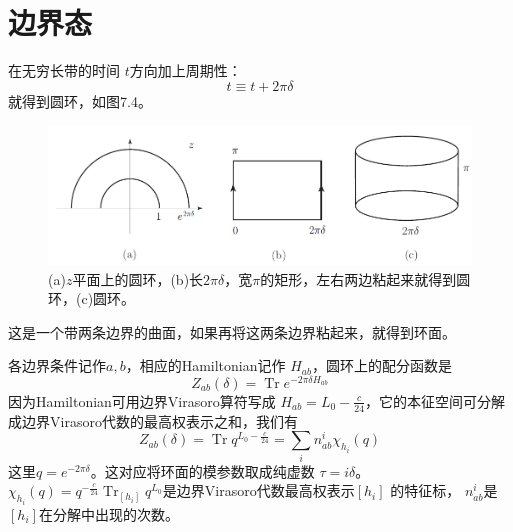 \section{边界态}
在无穷长带的时间 $t $方向加上周期性：
$$
t \equiv t+2 \pi \delta
$$
就得到圆环，如图7.4。
\begin{figure}[h]
	\centering
	\includegraphics[width=0.6\linewidth]{fig/7.4.png}
	\caption{(a)$z$平面上的圆环，(b)长$2\pi \delta$，宽$\pi$的矩形，左右两边粘起来就得到圆环，(c)圆环。}
\end{figure}

这是一个带两条边界的曲面，如果再将这两条边界粘起来，就得到环面。

各边界条件记作$ a,b $，相应的Hamiltonian记作 $H_{ab} $，圆环上的配分函数是
\begin{equation}
	Z_{a b}(\delta)=\operatorname{Tr} e^{-2 \pi \delta H_{a b}} 
\end{equation}
因为Hamiltonian可用边界Virasoro算符写成 $H_{a b}=L_{0}-\frac{c}{24} $，它的本征空间可分解成边界Virasoro代数的最高权表示之和，我们有
\begin{equation}
	Z_{a b}(\delta)=\operatorname{Tr} q^{L_{0}-\frac{c}{24}}=\sum_{i} n_{a b}^{i} \chi_{h_{i}}(q)
\end{equation} 
这里$ q=e^{-2 \pi \delta} $。这对应将环面的模参数取成纯虚数 $\tau=i \delta $。$ \chi_{h_{i}}(q)=q^{-\frac{c}{24}} \operatorname{Tr}_{\left[h_{i}\right]} q^{L_{0}} $是边界Virasoro代数最高权表示$ [h_i]$ 的特征标， $n_{a b}^{i} $是$ [h_i] $在分解中出现的次数。

